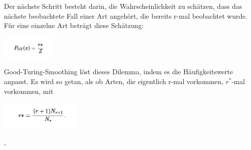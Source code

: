 \documentclass[12pt]{article}
\begin{document}
Der nächste Schritt besteht darin, die Wahrscheinlichkeit zu schätzen, dass das nächste beobachtete Fall einer Art angehört, die bereits r-mal beobachtet wurde. Für eine einzelne Art beträgt diese Schätzung:
\begin{center}
	\includegraphics[width=0.2\textwidth]{statics/Borisov/6.PNG}
\end{center}
Good-Turing-Smoothing löst dieses Dilemma, indem es die Häufigkeitswerte anpasst. Es wird so getan, als ob Arten, die eigentlich r-mal vorkommen, \( r^* \)-mal vorkommen, mit
\begin{center}
	\includegraphics[width=0.3\textwidth]{statics/Borisov/7.PNG}
\end{center}
\cite{maucher2022}, \cite{gale1995}
\end{document}
